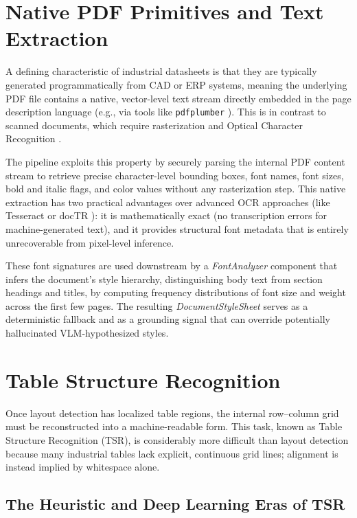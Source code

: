 \section{Native PDF Primitives and Text Extraction}
\label{sec:pdfplumber}

A defining characteristic of industrial datasheets is that they are typically generated programmatically from CAD or ERP systems, meaning the underlying PDF file contains a native, vector-level text stream directly embedded in the page description language (e.g., via tools like \texttt{pdfplumber} \citep{pdfplumber}). This is in contrast to scanned documents, which require rasterization and Optical Character Recognition \citep{donut, nougat}.

The pipeline exploits this property by securely parsing the internal PDF content stream to retrieve precise character-level bounding boxes, font names, font sizes, bold and italic flags, and color values without any rasterization step. This native extraction has two practical advantages over advanced OCR approaches (like Tesseract \citep{tesseract} or docTR \citep{doctr}): it is mathematically exact (no transcription errors for machine-generated text), and it provides structural font metadata that is entirely unrecoverable from pixel-level inference.

These font signatures are used downstream by a \textit{FontAnalyzer} component that infers the document's style hierarchy, distinguishing body text from section headings and titles, by computing frequency distributions of font size and weight across the first few pages. The resulting \textit{DocumentStyleSheet} serves as a deterministic fallback and as a grounding signal that can override potentially hallucinated VLM-hypothesized styles.

\section{Table Structure Recognition}
\label{sec:tsr_limits}

Once layout detection has localized table regions, the internal row--column grid must be reconstructed into a machine-readable form. This task, known as Table Structure Recognition (TSR), is considerably more difficult than layout detection because many industrial tables lack explicit, continuous grid lines; alignment is instead implied by whitespace alone.

\subsection{The Heuristic and Deep Learning Eras of TSR}
\label{subsec:tsr_evolution}

